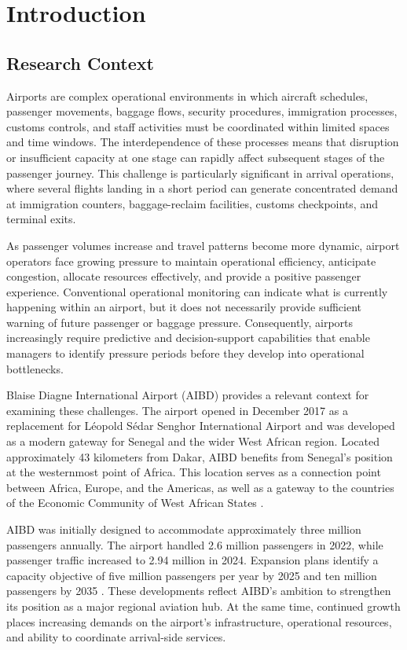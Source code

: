 \chapter{Introduction}
\label{chap:introduction}

\section{Research Context}
\label{sec:research-context}

Airports are complex operational environments in which aircraft schedules, passenger movements, baggage flows, security procedures, immigration processes, customs controls, and staff activities must be coordinated within limited spaces and time windows. The interdependence of these processes means that disruption or insufficient capacity at one stage can rapidly affect subsequent stages of the passenger journey. This challenge is particularly significant in arrival operations, where several flights landing in a short period can generate concentrated demand at immigration counters, baggage-reclaim facilities, customs checkpoints, and terminal exits.

As passenger volumes increase and travel patterns become more dynamic, airport operators face growing pressure to maintain operational efficiency, anticipate congestion, allocate resources effectively, and provide a positive passenger experience. Conventional operational monitoring can indicate what is currently happening within an airport, but it does not necessarily provide sufficient warning of future passenger or baggage pressure. Consequently, airports increasingly require predictive and decision-support capabilities that enable managers to identify pressure periods before they develop into operational bottlenecks.

Blaise Diagne International Airport (AIBD) provides a relevant context for examining these challenges. The airport opened in December 2017 as a replacement for Léopold Sédar Senghor International Airport and was developed as a modern gateway for Senegal and the wider West African region. Located approximately 43 kilometers from Dakar, AIBD benefits from Senegal's position at the westernmost point of Africa. This location serves as a connection point between Africa, Europe, and the Americas, as well as a gateway to the countries of the Economic Community of West African States \parencite{demir2025speaker}.

AIBD was initially designed to accommodate approximately three million passengers annually. The airport handled 2.6 million passengers in 2022, while passenger traffic increased to 2.94 million in 2024. Expansion plans identify a capacity objective of five million passengers per year by 2025 and ten million passengers by 2035 \parencite{demir2025speaker}. These developments reflect AIBD's ambition to strengthen its position as a major regional aviation hub. At the same time, continued growth places increasing demands on the airport's infrastructure, operational resources, and ability to coordinate arrival-side services.

